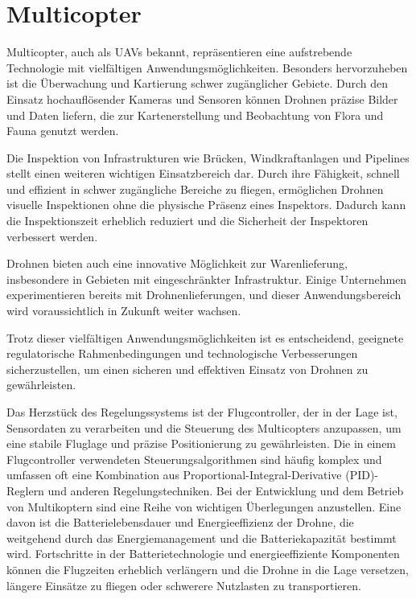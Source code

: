 \section{Multicopter} \label{drohne:section}

Multicopter, auch als \ac{UAV}s bekannt, repräsentieren eine aufstrebende Technologie mit vielfältigen Anwendungsmöglichkeiten. Besonders hervorzuheben ist die Überwachung und Kartierung schwer zugänglicher Gebiete. Durch den Einsatz hochauflösender Kameras und Sensoren können Drohnen präzise Bilder und Daten liefern, die zur Kartenerstellung und Beobachtung von Flora und Fauna genutzt werden.

Die Inspektion von Infrastrukturen wie Brücken, Windkraftanlagen und Pipelines stellt einen weiteren wichtigen Einsatzbereich dar. Durch ihre Fähigkeit, schnell und effizient in schwer zugängliche Bereiche zu fliegen, ermöglichen Drohnen visuelle Inspektionen ohne die physische Präsenz eines Inspektors. Dadurch kann die Inspektionszeit erheblich reduziert und die Sicherheit der Inspektoren verbessert werden.

Drohnen bieten auch eine innovative Möglichkeit zur Warenlieferung, insbesondere in Gebieten mit eingeschränkter Infrastruktur. Einige Unternehmen experimentieren bereits mit Drohnenlieferungen, und dieser Anwendungsbereich wird voraussichtlich in Zukunft weiter wachsen.

Trotz dieser vielfältigen Anwendungsmöglichkeiten ist es entscheidend, geeignete regulatorische Rahmenbedingungen und technologische Verbesserungen sicherzustellen, um einen sicheren und effektiven Einsatz von Drohnen zu gewährleisten.


Das Herzstück des Regelungssystems ist der Flugcontroller, der in der Lage ist, Sensordaten zu verarbeiten und die Steuerung des Multicopters anzupassen, um eine stabile Fluglage und präzise Positionierung zu gewährleisten. Die in einem Flugcontroller verwendeten Steuerungsalgorithmen sind häufig komplex und umfassen oft eine Kombination aus Proportional-Integral-Derivative (PID)-Reglern und anderen Regelungstechniken.
Bei der Entwicklung und dem Betrieb von Multikoptern sind eine Reihe von wichtigen Überlegungen anzustellen. Eine davon ist die Batterielebensdauer und Energieeffizienz der Drohne, die weitgehend durch das Energiemanagement und die Batteriekapazität bestimmt wird. Fortschritte in der Batterietechnologie und energieeffiziente Komponenten können die Flugzeiten erheblich verlängern und die Drohne in die Lage versetzen, längere Einsätze zu fliegen oder schwerere Nutzlasten zu transportieren.


